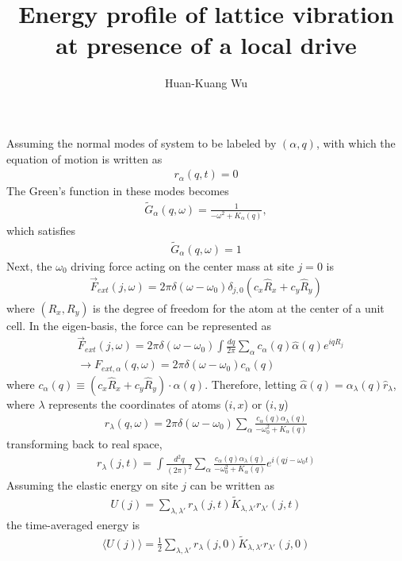\documentclass[12pt]{article}
\begin{document}
 
 
 
\title{Energy profile of lattice vibration at presence of a local drive}%
\author{Huan-Kuang Wu} %
\maketitle

Assuming the normal modes of system to be labeled by $(\alpha, q)$, with which the equation of motion is written as
\begin{align}
[\partial_t^2 + K_\alpha(q)] r_\alpha(q,t) = 0
\end{align}
The Green's function in these modes becomes
\begin{align}
\tilde{G}_{\alpha}(q,\omega) = \frac{1}{-\omega^2+K_\alpha(q)},
\end{align}
which satisfies
\begin{align}
[-\omega^2+K_\alpha(q)]\tilde{G}_{\alpha}(q,\omega) = 1
\end{align}
Next, the $\omega_0$ driving force acting on the center mass at site $j=0$ is
\begin{align}
\vec{F}_{ext}(j, \omega) = 2\pi\delta(\omega-\omega_0)\delta_{j,0}(c_x\hat{R}_x +c_y\hat{R}_y)
\end{align}
where $(R_x,R_y)$ is the degree of freedom for the atom at the center of a unit cell.
In the eigen-basis, the force can be represented as
\begin{align}
&\vec{F}_{ext}(j, \omega) = 2\pi\delta(\omega-\omega_0)  \int \frac{dq}{2\pi} \sum_{\alpha} c_\alpha(q) \hat{\alpha}(q) e^{iq R_j}\nonumber\\&
\rightarrow F_{ext,\alpha}(q,\omega) = 2\pi \delta(\omega-\omega_0)c_\alpha (q)
\end{align}
where $c_\alpha(q) \equiv (c_x\hat{R}_x +c_y\hat{R}_y)\cdot\hat{\alpha}(q)$.
Therefore, letting $\hat{\alpha}(q) = \alpha_{\lambda}(q) \hat{r}_\lambda$, where $\lambda$ represents the coordinates of atoms ($i,x$) or ($i,y$)
\begin{align}
r_\lambda(q,\omega) = 2\pi\delta(\omega-\omega_0) \sum_{\alpha}\frac{c_\alpha(q)\alpha_\lambda(q)}{-\omega_0^2+K_\alpha(q)}
\end{align}
transforming back to real space, 
\begin{align}
r_\lambda(j,t) = \int \frac{d^2q}{(2\pi)^2} \sum_{\alpha}\frac{c_\alpha(q)\alpha_\lambda(q) }{-\omega_0^2+K_\alpha(q)}e^{i(qj-\omega_0 t)}
\end{align}
Assuming the elastic energy on site $j$ can be written as 
\begin{align}
U(j) = \sum_{\lambda,\lambda'}r_\lambda(j,t) \tilde{K}_{\lambda,\lambda'}r_{\lambda'}(j,t)
\end{align}
the time-averaged energy is
\begin{align}
\langle U(j)\rangle = \frac{1}{2} \sum_{\lambda,\lambda'}r_\lambda(j,0) \tilde{K}_{\lambda,\lambda'}r_{\lambda'}(j,0)
\end{align}
\end{document}
